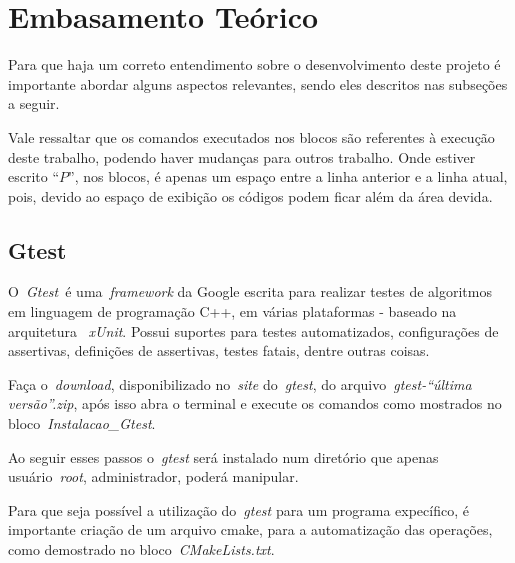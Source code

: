 \documentclass[conference]{Trabalho_1}
\begin{document}


\section{Embasamento Te\'orico}
Para que haja um correto entendimento sobre o desenvolvimento deste projeto \'e importante abordar alguns aspectos relevantes, sendo eles descritos nas subse\c{c}\~oes a seguir.

Vale ressaltar que os comandos executados nos blocos s\~ao referentes \`a execu\c{c}\~ao deste trabalho, podendo haver mudan\c{c}as para outros trabalho. Onde estiver escrito ``$P$'', nos blocos, \'e apenas um espa\c{c}o entre a linha anterior e a linha atual, pois, devido ao espa\c{c}o de exibi\c{c}\~ao os c\'odigos podem ficar al\'em da \'area devida.

\subsection{Gtest}
O~\textit{Gtest}\cite{gtest}~\'e uma~\textit{framework} da Google escrita para realizar testes de algoritmos em linguagem de programa\c{c}\~ao C++, em v\'arias plataformas - baseado na arquitetura ~\textit{xUnit}. Possui suportes para testes automatizados, configura\c{c}\~oes de assertivas, defini\c{c}\~oes de assertivas, testes fatais, dentre outras coisas.

Fa\c{c}a o~\textit{download}, disponibilizado no~\textit{site} do~\textit{gtest}, do arquivo~\textit{gtest-``\'ultima vers\~ao''.zip}, ap\'os isso abra o terminal e execute os comandos como mostrados no bloco~\textit{Instalacao\_Gtest}.



Ao seguir esses passos o~\textit{gtest} ser\'a instalado num diret\'orio que apenas usu\'ario~\textit{root}, administrador, poder\'a manipular.

Para que seja poss\'ivel a utiliza\c{c}\~ao do~\textit{gtest} para um programa expec\'ifico, \'e importante cria\c{c}\~ao de um arquivo cmake, para a automatiza\c{c}\~ao das opera\c{c}\~oes, como demostrado no bloco~\textit{CMakeLists.txt}.
\end{document}
